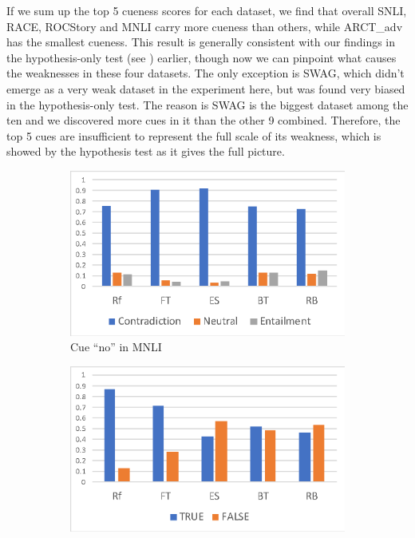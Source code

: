 If we sum up the top 5 cueness scores for each dataset, we find that
overall SNLI, RACE, ROCStory and MNLI carry more cueness than others,
while ARCT\_adv has the smallest cueness. This result is
generally consistent with our findings in the hypothesis-only test (see )
earlier,
though now we can pinpoint what causes the weaknesses in these four
datasets. The only exception is SWAG, which didn't emerge as a very
weak dataset in the experiment here, but was found very biased in
the hypothesis-only test. The reason is SWAG is the biggest dataset
among the ten and we discovered more cues in it than
the other 9 combined. Therefore, the top 5 cues are insufficient
to represent the full scale of its weakness, which is showed by
the hypothesis test as it gives the full picture.

\begin{figure}[th]
\centering
\begin{subfigure}[b]{0.3\textwidth}
\centering
\includegraphics[width=\columnwidth]{picture/no_mnli.eps}
\caption{Cue ``no'' in MNLI}
\label{fig:cue_no}
\end{subfigure}
\hfill
\begin{subfigure}[b]{0.3\textwidth}
\centering
\includegraphics[width=\columnwidth]{picture/above_arct.eps}

\end{subfigure}
\end{figure}
